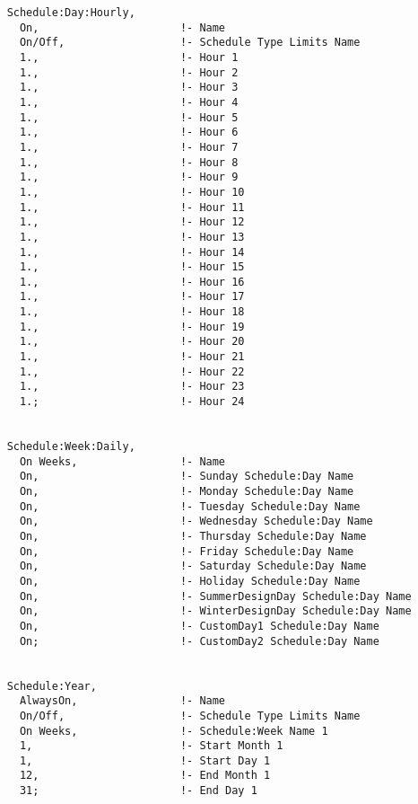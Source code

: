 \begin{lstlisting}
    Schedule:Day:Hourly,
      On,                      !- Name
      On/Off,                  !- Schedule Type Limits Name
      1.,                      !- Hour 1
      1.,                      !- Hour 2
      1.,                      !- Hour 3
      1.,                      !- Hour 4
      1.,                      !- Hour 5
      1.,                      !- Hour 6
      1.,                      !- Hour 7
      1.,                      !- Hour 8
      1.,                      !- Hour 9
      1.,                      !- Hour 10
      1.,                      !- Hour 11
      1.,                      !- Hour 12
      1.,                      !- Hour 13
      1.,                      !- Hour 14
      1.,                      !- Hour 15
      1.,                      !- Hour 16
      1.,                      !- Hour 17
      1.,                      !- Hour 18
      1.,                      !- Hour 19
      1.,                      !- Hour 20
      1.,                      !- Hour 21
      1.,                      !- Hour 22
      1.,                      !- Hour 23
      1.;                      !- Hour 24


    Schedule:Week:Daily,
      On Weeks,                !- Name
      On,                      !- Sunday Schedule:Day Name
      On,                      !- Monday Schedule:Day Name
      On,                      !- Tuesday Schedule:Day Name
      On,                      !- Wednesday Schedule:Day Name
      On,                      !- Thursday Schedule:Day Name
      On,                      !- Friday Schedule:Day Name
      On,                      !- Saturday Schedule:Day Name
      On,                      !- Holiday Schedule:Day Name
      On,                      !- SummerDesignDay Schedule:Day Name
      On,                      !- WinterDesignDay Schedule:Day Name
      On,                      !- CustomDay1 Schedule:Day Name
      On;                      !- CustomDay2 Schedule:Day Name


    Schedule:Year,
      AlwaysOn,                !- Name
      On/Off,                  !- Schedule Type Limits Name
      On Weeks,                !- Schedule:Week Name 1
      1,                       !- Start Month 1
      1,                       !- Start Day 1
      12,                      !- End Month 1
      31;                      !- End Day 1
\end{lstlisting}
